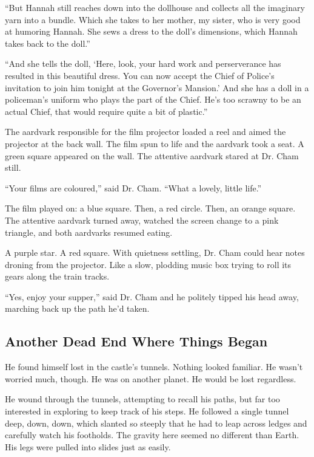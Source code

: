 \documentclass[12pt,twoside]{report}
\begin{document}
``But Hannah still reaches down into the dollhouse and collects all
the imaginary yarn into a bundle.  Which she takes to her mother, my
sister, who is very good at humoring Hannah. She sews a dress to the
doll's dimensions, which Hannah takes back to the doll.''

``And she tells the doll, `Here, look, your hard work and
perserverance has resulted in this beautiful dress. You can now accept
the Chief of Police's invitation to join him tonight at the Governor's
Mansion.'  And she has a doll in a policeman's uniform who plays the
part of the Chief.  He's too scrawny to be an actual Chief, that would
require quite a bit of plastic.''

The aardvark responsible for the film projector loaded a reel and
aimed the projector at the back wall.  The film spun to life and the
aardvark took a seat.  A green square appeared on the wall.  The
attentive aardvark stared at Dr. Cham still.

``Your films are coloured,'' said Dr. Cham.  ``What a lovely, little
life.''

The film played on: a blue square.  Then, a red circle.  Then, an
orange square.  The attentive aardvark turned away, watched the screen
change to a pink triangle, and both aardvarks resumed eating.

A purple star.  A red square.  With quietness settling, Dr. Cham could
hear notes droning from the projector.  Like a slow, plodding music
box trying to roll its gears along the train tracks.

``Yes, enjoy your supper,'' said Dr. Cham and he politely tipped his
head away, marching back up the path he'd taken.



\subsection{Another Dead End Where Things Began}



He found himself lost in the castle's tunnels.  Nothing looked
familiar.  He wasn't worried much, though.  He was on another planet.
He would be lost regardless.

He wound through the tunnels, attempting to recall his paths, but far
too interested in exploring to keep track of his steps.  He followed a
single tunnel deep, down, down, which slanted so steeply that he had
to leap across ledges and carefully watch his footholds. The gravity
here seemed no different than Earth.  His legs were pulled into slides
just as easily.
\end{document}
